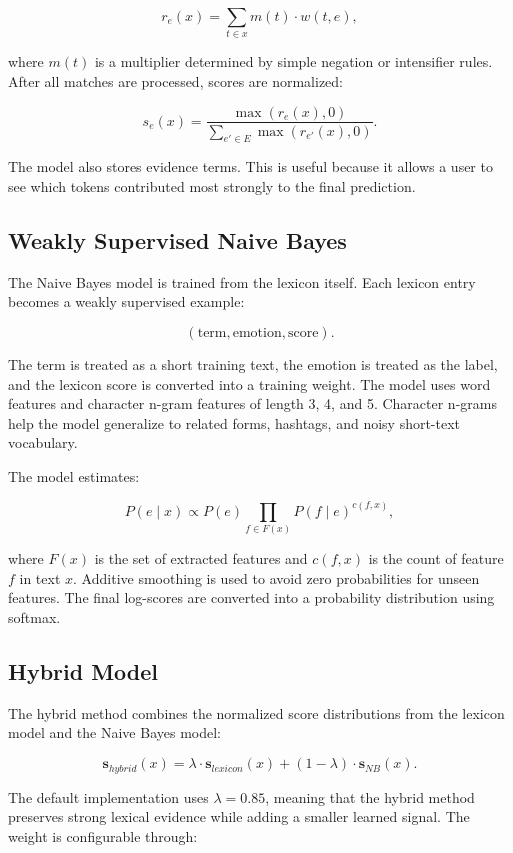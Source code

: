 \documentclass[11pt]{article}
\begin{document}
\[
r_e(x) = \sum_{t \in x} m(t) \cdot w(t,e),
\]

where $m(t)$ is a multiplier determined by simple negation or intensifier rules. After all matches are processed, scores are normalized:

\[
s_e(x) = \frac{\max(r_e(x), 0)}{\sum_{e' \in E} \max(r_{e'}(x), 0)}.
\]

The model also stores evidence terms. This is useful because it allows a user to see which tokens contributed most strongly to the final prediction.

\subsection{Weakly Supervised Naive Bayes}

The Naive Bayes model is trained from the lexicon itself. Each lexicon entry becomes a weakly supervised example:

\[
(\text{term}, \text{emotion}, \text{score}).
\]

The term is treated as a short training text, the emotion is treated as the label, and the lexicon score is converted into a training weight. The model uses word features and character n-gram features of length 3, 4, and 5. Character n-grams help the model generalize to related forms, hashtags, and noisy short-text vocabulary.

The model estimates:

\[
P(e \mid x) \propto P(e) \prod_{f \in F(x)} P(f \mid e)^{c(f,x)},
\]

where $F(x)$ is the set of extracted features and $c(f,x)$ is the count of feature $f$ in text $x$. Additive smoothing is used to avoid zero probabilities for unseen features. The final log-scores are converted into a probability distribution using softmax.

\subsection{Hybrid Model}

The hybrid method combines the normalized score distributions from the lexicon model and the Naive Bayes model:

\[
\mathbf{s}_{hybrid}(x) = \lambda \cdot \mathbf{s}_{lexicon}(x) + (1 - \lambda) \cdot \mathbf{s}_{NB}(x).
\]

The default implementation uses $\lambda = 0.85$, meaning that the hybrid method preserves strong lexical evidence while adding a smaller learned signal. The weight is configurable through:
\end{document}
